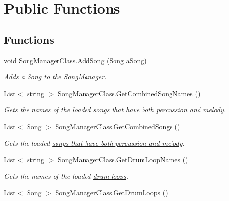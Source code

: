 \hypertarget{group___s_m_pub_func}{}\section{Public Functions}
\label{group___s_m_pub_func}
\subsection*{Functions}
\begin{DoxyCompactItemize}
\item 
void \hyperlink{group___s_m_pub_func_ga1a228cb2a64e55448ccf9d1d618f05b7}{Song\+Manager\+Class.\+Add\+Song} (\hyperlink{class_song}{Song} a\+Song)
\begin{DoxyCompactList}\small\item\em Adds a \hyperlink{class_song}{Song} to the Song\+Manager. \end{DoxyCompactList}\item 
List$<$ string $>$ \hyperlink{group___s_m_pub_func_ga87bd14c75666b13bd02510c5b7080784}{Song\+Manager\+Class.\+Get\+Combined\+Song\+Names} ()
\begin{DoxyCompactList}\small\item\em Gets the names of the loaded \hyperlink{group___song_group_DocSongCombined}{songs that have both percussion and melody}. \end{DoxyCompactList}\item 
List$<$ \hyperlink{class_song}{Song} $>$ \hyperlink{group___s_m_pub_func_ga413595693011bd6021dfd6eb941bf0e6}{Song\+Manager\+Class.\+Get\+Combined\+Songs} ()
\begin{DoxyCompactList}\small\item\em Gets the loaded \hyperlink{group___song_group_DocSongCombined}{songs that have both percussion and melody}. \end{DoxyCompactList}\item 
List$<$ string $>$ \hyperlink{group___s_m_pub_func_ga90e0aeb3117c5db6c667a23252bf45f6}{Song\+Manager\+Class.\+Get\+Drum\+Loop\+Names} ()
\begin{DoxyCompactList}\small\item\em Gets the names of the loaded \hyperlink{group___song_group_DocSongDrumLoop}{drum loops}. \end{DoxyCompactList}\item 
List$<$ \hyperlink{class_song}{Song} $>$ \hyperlink{group___s_m_pub_func_ga354a675f296f9a733ad6d76fea7429dd}{Song\+Manager\+Class.\+Get\+Drum\+Loops} ()

\end{DoxyCompactItemize}
